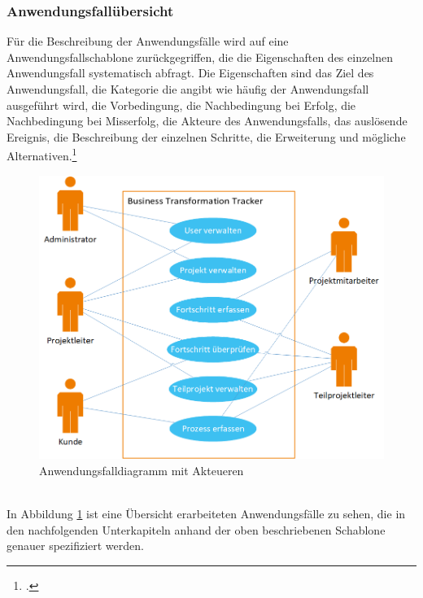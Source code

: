 \subsubsection{Anwendungsfallübersicht}
Für die Beschreibung der Anwendungsfälle wird auf eine Anwendungsfallschablone zurückgegriffen, die die Eigenschaften des einzelnen Anwendungsfall systematisch abfragt. Die Eigenschaften sind das Ziel des Anwendungsfall, die Kategorie die angibt wie häufig der Anwendungsfall ausgeführt wird, die Vorbedingung, die Nachbedingung bei Erfolg, die Nachbedingung bei Misserfolg, die Akteure des Anwendungsfalls, das auslösende Ereignis, die Beschreibung der einzelnen Schritte, die Erweiterung und mögliche Alternativen.\footcite[Vgl.][S. 261]{balzert}
\begin{figure}[h]
    \centering
    \includegraphics[scale=0.67]{./Bilder/Anwendungsfalldiagramm.png}
    \caption[Anwendungsfalldiagramm]{Anwendungsfalldiagramm mit Akteueren}
    \label{fig:Anwendungsfalldiagramm}
\end{figure}
\\In Abbildung \ref{fig:Anwendungsfalldiagramm} ist eine Übersicht erarbeiteten Anwendungsfälle zu sehen, die in den nachfolgenden Unterkapiteln anhand der oben beschriebenen Schablone genauer spezifiziert werden.

\newpage
